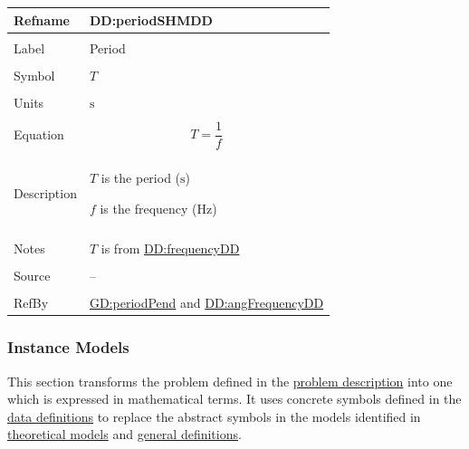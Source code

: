 \documentclass[12pt]{article}
\begin{document}
\vspace{\baselineskip}
\noindent
\begin{minipage}{\textwidth}
\begin{tabular}{>{\raggedright}p{}>{\raggedright\arraybackslash}p{}}
\toprule \textbf{Refname} & \textbf{DD:periodSHMDD}
\label{DD:periodSHMDD}
\\ \midrule \\
Label & Period
        
\\ \midrule \\
Symbol & $T$
         
\\ \midrule \\
Units & ${\text{s}}$
        
\\ \midrule \\
Equation & \begin{displaymath}
           T=\frac{1}{f}
           \end{displaymath}
\\ \midrule \\
Description & \begin{symbDescription}
              \item{$T$ is the period (${\text{s}}$)}
              \item{$f$ is the frequency (${\text{Hz}}$)}
              \end{symbDescription}
\\ \midrule \\
Notes & $T$ is from \hyperref[DD:frequencyDD]{DD:frequencyDD}
        
\\ \midrule \\
Source & --
         
\\ \midrule \\
RefBy & \hyperref[GD:periodPend]{GD:periodPend} and \hyperref[DD:angFrequencyDD]{DD:angFrequencyDD}
        
\\ \bottomrule
\end{tabular}
\end{minipage}

\subsubsection{Instance Models}
\label{Sec:IMs}
This section transforms the problem defined in the \hyperref[Sec:ProbDesc]{problem description} into one which is expressed in mathematical terms. It uses concrete symbols defined in the \hyperref[Sec:DDs]{data definitions} to replace the abstract symbols in the models identified in \hyperref[Sec:TMs]{theoretical models} and \hyperref[Sec:GDs]{general definitions}.
\end{document}
